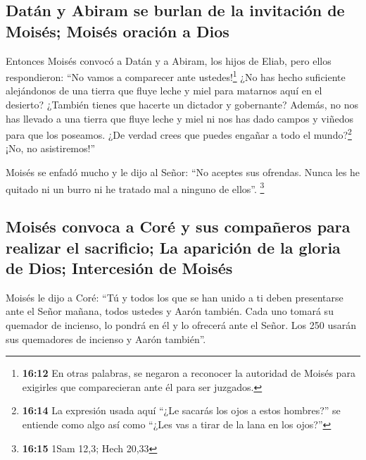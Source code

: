 \hypertarget{datuxe1n-y-abiram-se-burlan-de-la-invitaciuxf3n-de-moisuxe9s-moisuxe9s-oraciuxf3n-a-dios}{%
\subsection{Datán y Abiram se burlan de la invitación de Moisés; Moisés
oración a
Dios}\label{datuxe1n-y-abiram-se-burlan-de-la-invitaciuxf3n-de-moisuxe9s-moisuxe9s-oraciuxf3n-a-dios}}

 Entonces Moisés convocó a Datán y a Abiram, los hijos de
Eliab, pero ellos respondieron: ``No vamos a comparecer ante
ustedes!\footnote{\textbf{16:12} En otras palabras, se negaron a
  reconocer la autoridad de Moisés para exigirles que comparecieran ante
  él para ser juzgados.}  ¿No has hecho suficiente
alejándonos de una tierra que fluye leche y miel para matarnos aquí en
el desierto? ¿También tienes que hacerte un dictador y gobernante?
 Además, no nos has llevado a una tierra que fluye leche
y miel ni nos has dado campos y viñedos para que los poseamos. ¿De
verdad crees que puedes engañar a todo el mundo?\footnote{\textbf{16:14}
  La expresión usada aquí ``¿Le sacarás los ojos a estos hombres?'' se
  entiende como algo así como ``¿Les vas a tirar de la lana en los
  ojos?''} ¡No, no asistiremos!''

 Moisés se enfadó mucho y le dijo al Señor: ``No aceptes
sus ofrendas. Nunca les he quitado ni un burro ni he tratado mal a
ninguno de ellos''. \footnote{\textbf{16:15} 1Sam 12,3; Hech 20,33}

\hypertarget{moisuxe9s-convoca-a-coruxe9-y-sus-compauxf1eros-para-realizar-el-sacrificio-la-apariciuxf3n-de-la-gloria-de-dios-intercesiuxf3n-de-moisuxe9s}{%
\subsection{Moisés convoca a Coré y sus compañeros para realizar el
sacrificio; La aparición de la gloria de Dios; Intercesión de
Moisés}\label{moisuxe9s-convoca-a-coruxe9-y-sus-compauxf1eros-para-realizar-el-sacrificio-la-apariciuxf3n-de-la-gloria-de-dios-intercesiuxf3n-de-moisuxe9s}}

 Moisés le dijo a Coré: ``Tú y todos los que se han unido
a ti deben presentarse ante el Señor mañana, todos ustedes y Aarón
también.  Cada uno tomará su quemador de incienso, lo
pondrá en él y lo ofrecerá ante el Señor. Los 250 usarán sus quemadores
de incienso y Aarón también''.

